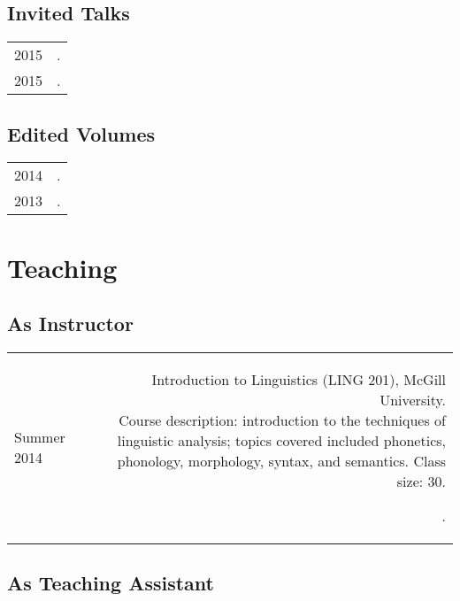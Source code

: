 \documentclass[11pt,letterpaper,twoside]{article}
\makeatletter
\newcommand{\bodywidth}{0.75}
\newenvironment{cvsection}{%
  \renewcommand{\arraystretch}{1.75}
  \begin{longtable}[l]{@{} L R @{}}
}{%
  \end{longtable}
}
\newcommand{\course}[3]{%
  \parbox[t]{\bodywidth\textwidth}{#1.\\ {\footnotesize Course description: #2.
      Class size: #3.}}
}
\makeatother
\begin{document}
\clearpage

\subsection*{Invited Talks}

\begin{cvsection}
  2015 & .\\
  2015 & .\\
\end{cvsection}

\subsection*{Edited Volumes}

\begin{cvsection}
  2014 & .\\
  2013 & .
\end{cvsection}

\section*{Teaching}

\subsection*{As Instructor}

\begin{cvsection}
  {\small Summer} 2014 & \course{Introduction to Linguistics (LING 201), McGill
    University}{introduction to the techniques of linguistic analysis; topics
    covered included phonetics, phonology, morphology, syntax, and
    semantics}{30}.
\end{cvsection}

\subsection*{As Teaching Assistant}
\end{document}
